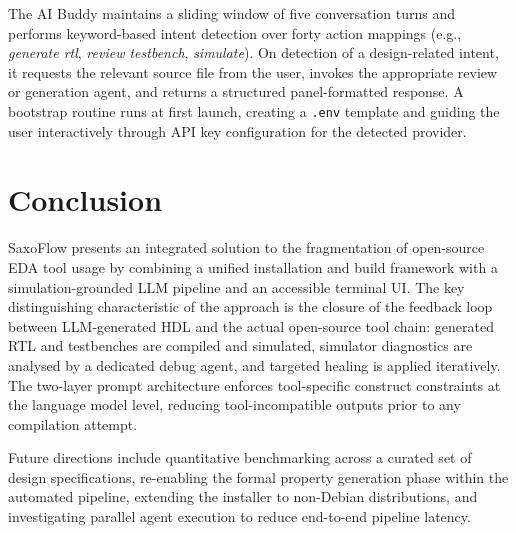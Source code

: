 The AI Buddy maintains a sliding window of five conversation turns and
performs keyword-based intent detection over forty action mappings
(e.g., \emph{generate rtl}, \emph{review testbench}, \emph{simulate}).
On detection of a design-related intent, it requests the relevant source file
from the user, invokes the appropriate review or generation agent, and returns
a structured panel-formatted response. A bootstrap routine runs at first
launch, creating a \texttt{.env} template and guiding the user interactively
through \ac{API} key configuration for the detected provider.

\section{Conclusion}
\label{sec:conclusion}

SaxoFlow presents an integrated solution to the fragmentation of open-source
\ac{EDA} tool usage by combining a unified installation and build framework
with a simulation-grounded \ac{LLM} pipeline and an accessible terminal
\ac{UI}. The key distinguishing characteristic of the approach is the closure
of the feedback loop between \ac{LLM}-generated \ac{HDL} and the actual
open-source tool chain: generated \ac{RTL} and testbenches are compiled and
simulated, simulator diagnostics are analysed by a dedicated debug agent, and
targeted healing is applied iteratively. The two-layer prompt architecture
enforces tool-specific construct constraints at the language model level,
reducing tool-incompatible outputs prior to any compilation attempt.

Future directions include quantitative benchmarking across a curated set of
design specifications, re-enabling the formal property generation phase within
the automated pipeline, extending the installer to non-Debian distributions,
and investigating parallel agent execution to reduce end-to-end pipeline
latency.

